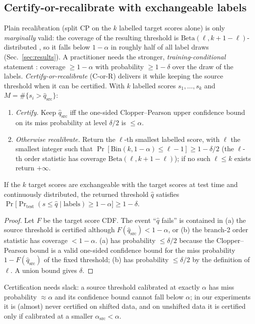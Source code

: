 \subsection{Certify-or-recalibrate with exchangeable labels}\label{sec:cor}
Plain recalibration (split CP on the $k$ labelled target scores alone) is only \emph{marginally} valid: the coverage of the resulting threshold is
$\mathrm{Beta}(\ell,k+1-\ell)$-distributed \cite{vovk2012conditional}, so it falls below $1-\alpha$ in roughly half of all
label draws (Sec.~\ref{sec:results}). A practitioner needs the stronger, \emph{training-conditional}
statement \cite{vovk2012conditional,bian2023training}: coverage $\ge 1-\alpha$ with probability $\ge 1-\delta$ over the draw of the labels.
\emph{Certify-or-recalibrate} (C-or-R) delivers it while keeping the source threshold when it can be certified.
With $k$ labelled scores $s_1,\dots,s_k$ and $M=\#\{s_i>\hat q_{\mathrm{src}}\}$:
\begin{enumerate}
\item \emph{Certify.} Keep $\hat q_{\mathrm{src}}$ iff the one-sided Clopper--Pearson upper confidence bound
\cite{clopper1934confidence} on its miss probability at level $\delta/2$ is $\le\alpha$.
\item \emph{Otherwise recalibrate.} Return the $\ell$-th smallest labelled score, with $\ell$ the smallest integer such that
$\Pr[\mathrm{Bin}(k,1-\alpha)\le \ell-1]\ge 1-\delta/2$ (the $\ell$-th order statistic has coverage $\mathrm{Beta}(\ell,k+1-\ell)$); if no such $\ell\le k$ exists
return $+\infty$.
\end{enumerate}
\begin{proposition}\label{prop:cor}
If the $k$ target scores are exchangeable with the target scores at test time and continuously distributed, the returned threshold
$\hat q$ satisfies $\Pr\big[\Pr_{\text{test}}(s\le\hat q\mid \text{labels})\ge 1-\alpha\big]\ge 1-\delta$.
\end{proposition}
\begin{proof}
Let $F$ be the target score CDF. The event ``$\hat q$ fails'' is contained in (a) the source threshold is certified although
$F(\hat q_{\mathrm{src}})<1-\alpha$, or (b) the branch-2 order statistic has coverage $<1-\alpha$. (a) has probability $\le\delta/2$ because the
Clopper--Pearson bound is a valid one-sided confidence bound for the miss probability $1-F(\hat q_{\mathrm{src}})$ of the fixed threshold; (b) has probability
$\le\delta/2$ by the definition of $\ell$. A union bound gives $\delta$.
\end{proof}
Certification needs slack: a source threshold calibrated at exactly $\alpha$ has miss probability $\approx\alpha$ and its confidence bound cannot fall below
$\alpha$; in our experiments it is (almost) never certified on shifted data, and on unshifted data it is certified only if calibrated at a smaller
$\alpha_{\mathrm{src}}<\alpha$.

